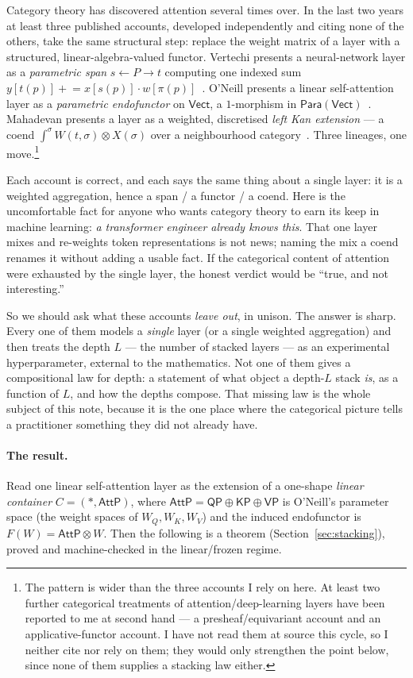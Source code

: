 \documentclass[11pt]{article}
\newcommand{\Vect}{\mathsf{Vect}}
\newcommand{\Para}{\mathsf{Para}}
\newcommand{\AttP}{\mathsf{AttP}}
\theoremstyle{plain}
\theoremstyle{definition}
\begin{document}
Category theory has discovered attention several times over. In the last two years at least
three published accounts, developed independently and citing none of the others, take the
same structural step: replace the weight matrix of a layer with a structured, linear-algebra-valued
functor. Vertechi presents a neural-network layer as a \emph{parametric span}
$s\leftarrow P\rightarrow t$ computing one indexed sum
$y[t(p)]\mathrel{+}= x[s(p)]\cdot w[\pi(p)]$~\cite{vertechi}. O'Neill presents a linear
self-attention layer as a \emph{parametric endofunctor} on $\Vect$, a $1$-morphism in
$\Para(\Vect)$~\cite{oneill}. Mahadevan presents a layer as a weighted, discretised
\emph{left Kan extension} --- a coend $\int^{\sigma} W(t,\sigma)\otimes X(\sigma)$ over a
neighbourhood category~\cite{ket}. Three lineages, one move.\footnote{The pattern is wider
than the three accounts I rely on here. At least two further categorical treatments of
attention/deep-learning layers have been reported to me at second hand --- a
presheaf/equivariant account and an applicative-functor account. I have not read them at
source this cycle, so I neither cite nor rely on them; they would only strengthen the point
below, since none of them supplies a stacking law either.}

Each account is correct, and each says the same thing about a single layer: it is a weighted
aggregation, hence a span / a functor / a coend. Here is the uncomfortable fact for anyone
who wants category theory to earn its keep in machine learning: \emph{a transformer engineer
already knows this}. That one layer mixes and re-weights token representations is not news;
naming the mix a coend renames it without adding a usable fact. If the categorical content of
attention were exhausted by the single layer, the honest verdict would be ``true, and not
interesting.''

So we should ask what these accounts \emph{leave out}, in unison. The answer is sharp. Every
one of them models a \emph{single} layer (or a single weighted aggregation) and then treats
the depth $L$ --- the number of stacked layers --- as an experimental hyperparameter, external
to the mathematics. Not one of them gives a compositional law for depth: a statement of what
object a depth-$L$ stack \emph{is}, as a function of $L$, and how the depths compose. That
missing law is the whole subject of this note, because it is the one place where the categorical
picture tells a practitioner something they did not already have.

\paragraph{The result.} Read one linear self-attention layer as the extension of a one-shape
\emph{linear container} $C=(\ast,\AttP)$, where $\AttP=\mathsf{QP}\oplus\mathsf{KP}\oplus\mathsf{VP}$
is O'Neill's parameter space (the weight spaces of $W_Q,W_K,W_V$) and the induced endofunctor is
$F(W)=\AttP\otimes W$. Then the following is a theorem (Section~\ref{sec:stacking}), proved and
machine-checked in the linear/frozen regime.
\end{document}
